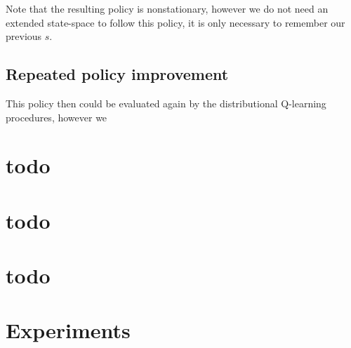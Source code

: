 Note that the resulting policy is nonstationary, however we do not need an extended state-space to follow this policy, it is only necessary to remember our previous $s$.

\subsection{Repeated policy improvement}
This policy then could be evaluated again by the distributional Q-learning procedures, however we 

\section{todo}


\section{todo}


\section{todo}


\section{Experiments}

